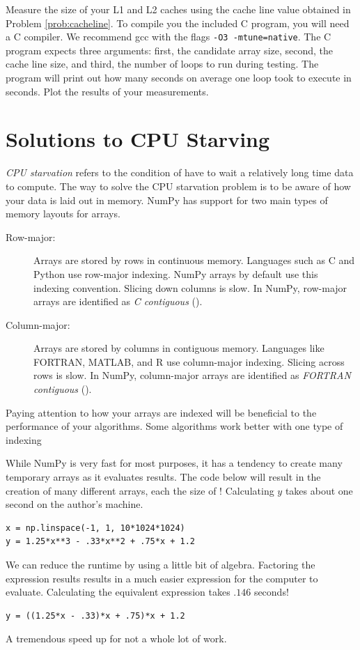 \begin{problem}
Measure the size of your L1 and L2 caches using the cache line value obtained in
Problem \ref{prob:cacheline}.  
To compile you the included C program, you will need a C compiler.
We recommend gcc with the flags \texttt{-O3 -mtune=native}.
The C program expects three arguments: first, the candidate array size, second, the cache line size, and third, the number of loops to run during testing.
The program will print out how many seconds on average one loop took to execute in seconds.
Plot the results of your measurements.
\end{problem}

\section*{Solutions to CPU Starving}
\emph{CPU starvation} refers to the condition of have to wait a relatively long time data to compute.
The way to solve the CPU starvation problem is to be aware of how your data is laid out in memory.
NumPy has support for two main types of memory layouts for arrays.
\begin{description}
\item[Row-major:] Arrays are stored by rows in continuous memory.
Languages such as C and Python use row-major indexing.  NumPy arrays by default use this indexing convention.
Slicing down columns is slow.  In NumPy, row-major arrays are identified as \emph{C contiguous} ().
\item[Column-major:] Arrays are stored by columns in contiguous memory.
Languages like FORTRAN, MATLAB, and R use column-major indexing.  Slicing across rows is slow.
In NumPy, column-major arrays are identified as \emph{FORTRAN contiguous} ().
\end{description}
Paying attention to how your arrays are indexed will be beneficial to the performance of your algorithms.
Some algorithms work better with one type of indexing

While NumPy is very fast for most purposes, it has a tendency to create many temporary arrays as it evaluates results.
The code below will result in the creation of many different arrays, each the size of !  
Calculating $y$ takes about one second on the author's machine.
\begin{lstlisting}
x = np.linspace(-1, 1, 10*1024*1024)
y = 1.25*x**3 - .33*x**2 + .75*x + 1.2
\end{lstlisting}
We can reduce the runtime by using a little bit of algebra.
Factoring the expression results results in a much easier expression for the computer to evaluate.
Calculating the equivalent expression takes $.146$ seconds!
\begin{lstlisting}
y = ((1.25*x - .33)*x + .75)*x + 1.2
\end{lstlisting}
A tremendous speed up for not a whole lot of work.

